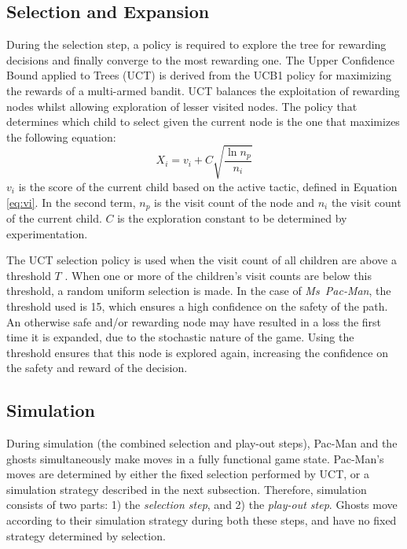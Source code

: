 \documentclass[journal]{IEEEtran}
\begin{document}
\subsection{Selection and Expansion}
\label{uct}
During the selection step, a policy is required to explore the tree for rewarding decisions and finally converge to the most rewarding one. The Upper Confidence Bound applied to Trees (UCT) \cite{kocsis2006bandit} is derived from the UCB1 policy \cite{auer2002using} for maximizing the rewards of a multi-armed bandit. UCT balances the exploitation of rewarding nodes whilst allowing exploration of lesser visited nodes. The policy that determines which child to select given the current node is the one that maximizes the following equation:
\begin{equation}
\label{eq:uct}
X_i = v_i + C \sqrt{ \frac{\ln{n_p}}{n_i}}
\end{equation}
$v_i$ is the score of the current child based on the active tactic, defined in Equation \ref{eq:vi}. In the second term, $n_p$ is the visit count of the node and $n_i$ the visit count of the current child. $C$ is the exploration constant to be determined by experimentation.

The UCT selection policy is used when the visit count of all children are above a threshold $T$ \cite{coulom2007efficient}. When one or more of the children's visit counts are below this threshold, a random uniform selection is made. In the case of {\it{Ms~Pac-Man}}, the threshold used is 15, which ensures a high confidence on the safety of the path. An otherwise safe and/or rewarding node may have resulted in a loss the first time it is expanded, due to the stochastic nature of the game. Using the threshold ensures that this node is explored again, increasing the confidence on the safety and reward of the decision.

\subsection{Simulation}
\label{simulation}
During simulation (the combined selection and play-out steps), Pac-Man and the ghosts simultaneously make moves in a fully functional game state. Pac-Man's moves are determined by either the fixed selection performed by UCT, or a simulation strategy described in the next subsection. Therefore, simulation consists of two parts: 1) the \emph{selection step}, and 2) the \emph{play-out step}. Ghosts move according to their simulation strategy during both these steps, and have no fixed strategy determined by selection.
\end{document}
